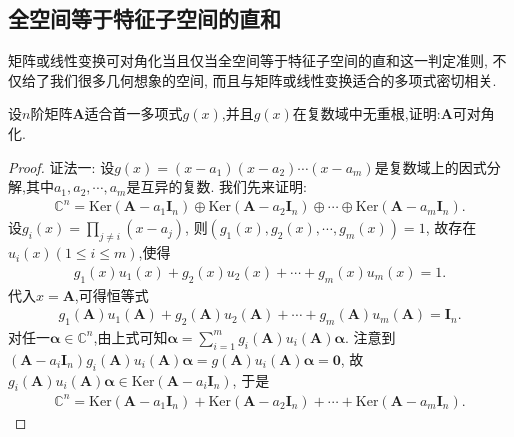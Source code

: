 \documentclass[../../main.tex]{subfiles}%
\begin{document}
\subsection{全空间等于特征子空间的直和}

矩阵或线性变换可对角化当且仅当全空间等于特征子空间的直和这一判定准则, 不仅给了我们很多几何想象的空间, 而且与矩阵或线性变换适合的多项式密切相关.

\begin{proposition}\label{proposition:适合的多项式无重根则可对角化}
设\(n\)阶矩阵\(\boldsymbol{A}\)适合首一多项式\(g(x)\),并且\(g(x)\)在复数域中无重根,证明:\(\boldsymbol{A}\)可对角化.
\end{proposition}
\begin{proof}

{\color{blue}证法一:}
设\(g(x) = (x - a_1)(x - a_2)\cdots(x - a_m)\)是复数域上的因式分解,其中\(a_1,a_2,\cdots,a_m\)是互异的复数. 我们先来证明:
\begin{align}
\mathbb{C}^n = \mathrm{Ker}(\boldsymbol{A} - a_1\boldsymbol{I}_n)\oplus \mathrm{Ker}(\boldsymbol{A} - a_2\boldsymbol{I}_n)\oplus\cdots\oplus \mathrm{Ker}(\boldsymbol{A} - a_m\boldsymbol{I}_n). \label{proposition0.7-6.5}
\end{align}
设\(g_i(x) = \prod_{j\neq i}(x - a_j)\), 则\((g_1(x),g_2(x),\cdots,g_m(x)) = 1\), 故存在\(u_i(x)(1\leqslant  i\leqslant  m)\),使得
\begin{align*}
g_1(x)u_1(x) + g_2(x)u_2(x) + \cdots + g_m(x)u_m(x) = 1.
\end{align*}
代入\(x = \boldsymbol{A}\),可得恒等式
\begin{align}
g_1(\boldsymbol{A})u_1(\boldsymbol{A}) + g_2(\boldsymbol{A})u_2(\boldsymbol{A}) + \cdots + g_m(\boldsymbol{A})u_m(\boldsymbol{A}) = \boldsymbol{I}_n. \label{proposition0.7-6.6}
\end{align}
对任一\(\boldsymbol{\alpha}\in \mathbb{C}^n\),由上式可知\(\boldsymbol{\alpha} = \sum_{i = 1}^{m}g_i(\boldsymbol{A})u_i(\boldsymbol{A})\boldsymbol{\alpha}\). 注意到\((\boldsymbol{A}-a_i\boldsymbol{I}_n)g_i(\boldsymbol{A})u_i(\boldsymbol{A})\boldsymbol{\alpha} = g(\boldsymbol{A})u_i(\boldsymbol{A})\boldsymbol{\alpha} = \boldsymbol{0}\), 故\(g_i(\boldsymbol{A})u_i(\boldsymbol{A})\boldsymbol{\alpha}\in \mathrm{Ker}(\boldsymbol{A} - a_i\boldsymbol{I}_n)\), 于是
\begin{align}
\mathbb{C}^n = \mathrm{Ker}(\boldsymbol{A} - a_1\boldsymbol{I}_n) + \mathrm{Ker}(\boldsymbol{A} - a_2\boldsymbol{I}_n) + \cdots + \mathrm{Ker}(\boldsymbol{A} - a_m\boldsymbol{I}_n). \label{proposition0.7-6.7}

\end{align}
\end{proof}
\end{document}
